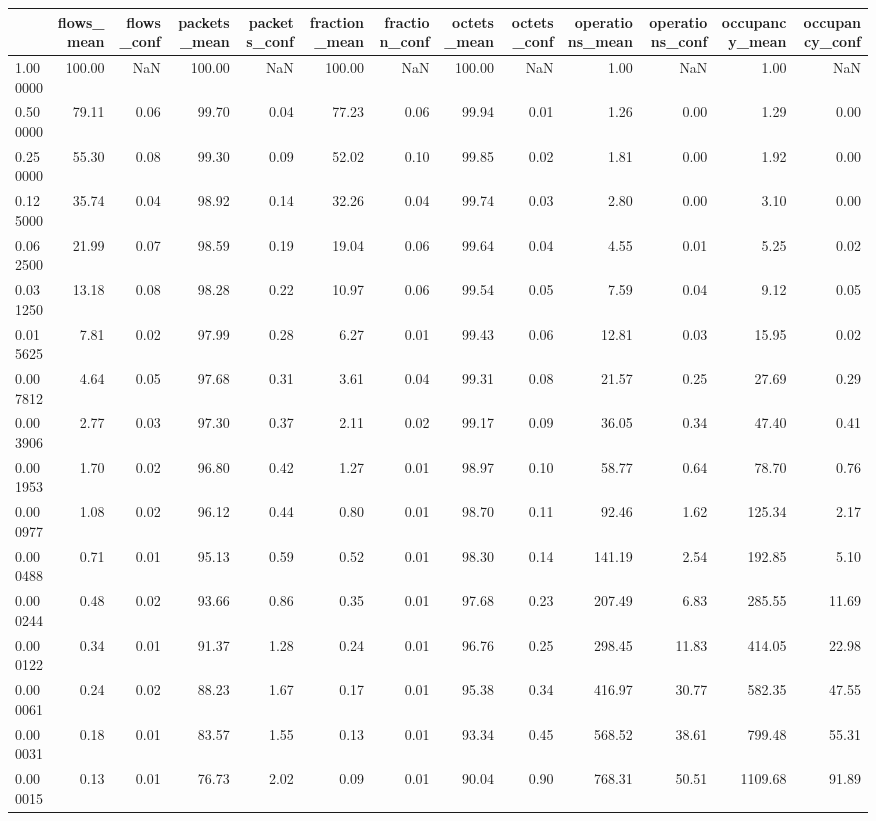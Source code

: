 \begin{tabular}{lrrrrrrrrrrrr}
\toprule
 & flows_mean & flows_conf & packets_mean & packets_conf & fraction_mean & fraction_conf & octets_mean & octets_conf & operations_mean & operations_conf & occupancy_mean & occupancy_conf \\
\midrule
1.000000 & 100.00 & NaN & 100.00 & NaN & 100.00 & NaN & 100.00 & NaN & 1.00 & NaN & 1.00 & NaN \\
0.500000 & 79.11 & 0.06 & 99.70 & 0.04 & 77.23 & 0.06 & 99.94 & 0.01 & 1.26 & 0.00 & 1.29 & 0.00 \\
0.250000 & 55.30 & 0.08 & 99.30 & 0.09 & 52.02 & 0.10 & 99.85 & 0.02 & 1.81 & 0.00 & 1.92 & 0.00 \\
0.125000 & 35.74 & 0.04 & 98.92 & 0.14 & 32.26 & 0.04 & 99.74 & 0.03 & 2.80 & 0.00 & 3.10 & 0.00 \\
0.062500 & 21.99 & 0.07 & 98.59 & 0.19 & 19.04 & 0.06 & 99.64 & 0.04 & 4.55 & 0.01 & 5.25 & 0.02 \\
0.031250 & 13.18 & 0.08 & 98.28 & 0.22 & 10.97 & 0.06 & 99.54 & 0.05 & 7.59 & 0.04 & 9.12 & 0.05 \\
0.015625 & 7.81 & 0.02 & 97.99 & 0.28 & 6.27 & 0.01 & 99.43 & 0.06 & 12.81 & 0.03 & 15.95 & 0.02 \\
0.007812 & 4.64 & 0.05 & 97.68 & 0.31 & 3.61 & 0.04 & 99.31 & 0.08 & 21.57 & 0.25 & 27.69 & 0.29 \\
0.003906 & 2.77 & 0.03 & 97.30 & 0.37 & 2.11 & 0.02 & 99.17 & 0.09 & 36.05 & 0.34 & 47.40 & 0.41 \\
0.001953 & 1.70 & 0.02 & 96.80 & 0.42 & 1.27 & 0.01 & 98.97 & 0.10 & 58.77 & 0.64 & 78.70 & 0.76 \\
0.000977 & 1.08 & 0.02 & 96.12 & 0.44 & 0.80 & 0.01 & 98.70 & 0.11 & 92.46 & 1.62 & 125.34 & 2.17 \\
0.000488 & 0.71 & 0.01 & 95.13 & 0.59 & 0.52 & 0.01 & 98.30 & 0.14 & 141.19 & 2.54 & 192.85 & 5.10 \\
0.000244 & 0.48 & 0.02 & 93.66 & 0.86 & 0.35 & 0.01 & 97.68 & 0.23 & 207.49 & 6.83 & 285.55 & 11.69 \\
0.000122 & 0.34 & 0.01 & 91.37 & 1.28 & 0.24 & 0.01 & 96.76 & 0.25 & 298.45 & 11.83 & 414.05 & 22.98 \\
0.000061 & 0.24 & 0.02 & 88.23 & 1.67 & 0.17 & 0.01 & 95.38 & 0.34 & 416.97 & 30.77 & 582.35 & 47.55 \\
0.000031 & 0.18 & 0.01 & 83.57 & 1.55 & 0.13 & 0.01 & 93.34 & 0.45 & 568.52 & 38.61 & 799.48 & 55.31 \\
0.000015 & 0.13 & 0.01 & 76.73 & 2.02 & 0.09 & 0.01 & 90.04 & 0.90 & 768.31 & 50.51 & 1109.68 & 91.89 \\

\end{tabular}
